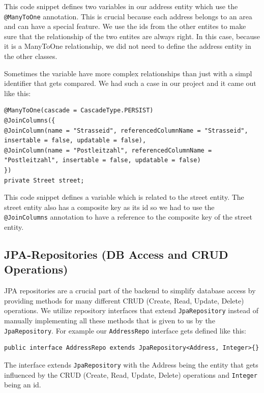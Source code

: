     This code snippet defines two variables in our address entity which use the \texttt{@ManyToOne} annotation. This is crucial because each address belongs to an area and can have a special feature. We use the ids from the other entites to make sure that the relationship of the two entites are always right. In this case, because it is a ManyToOne relationship, we did not need to define the address entity in the other classes. \newline

    Sometimes the variable have more complex relationships than just with a simpl identifier that gets compared. We had such a case in our project and it came out like this: 
    \lstset{style=mycsharp, caption=Complex ManyToOne Variable}
    \begin{lstlisting}
@ManyToOne(cascade = CascadeType.PERSIST)
@JoinColumns({
@JoinColumn(name = "Strasseid", referencedColumnName = "Strasseid", insertable = false, updatable = false),
@JoinColumn(name = "Postleitzahl", referencedColumnName = "Postleitzahl", insertable = false, updatable = false)
})
private Street street;                   
    \end{lstlisting} 
    This code snippet defines a variable which is related to the street entity. The street entity also has a composite key as its id so we had to use the \texttt{@JoinColumns} annotation to have a reference to the composite key of the street entity. 

    \subsection{JPA-Repositories (DB Access and CRUD Operations)}
    JPA repositories are a crucial part of the backend to simplify database access by providing methods for many different CRUD (Create, Read, Update, Delete) operations. We utilize repository interfaces that extend \texttt{JpaRepository} instead of manually implementing all these methods that is given to us by the \texttt{JpaRepository}. For example our \texttt{AddressRepo} interface gets defined like this:  \newline
    \lstset{style=mycsharp, caption=AddressRepo Interface}
    \begin{lstlisting}
public interface AddressRepo extends JpaRepository<Address, Integer>{}          
    \end{lstlisting} 
    The interface extends \texttt{JpaRepository} with the Address being the entity that gets influenced by the CRUD (Create, Read, Update, Delete) operations and \texttt{Integer} being an id. \newline

